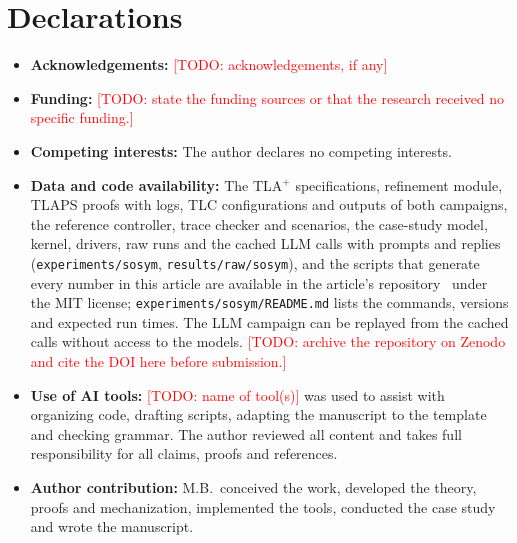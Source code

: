 \documentclass[pdflatex,sn-mathphys-num]{sn-jnl}
\theoremstyle{thmstyleone}%
\theoremstyle{thmstyletwo}%
\theoremstyle{thmstylethree}%
\newcommand{\todo}[1]{\textcolor{red}{[TODO: #1]}}
\newcommand{\tla}{TLA$^+$}
\begin{document}
\section*{Declarations}
\begin{itemize}
\item \textbf{Acknowledgements:} \todo{acknowledgements, if any}
\item \textbf{Funding:} \todo{state the funding sources or that the research received no specific funding.}
\item \textbf{Competing interests:} The author declares no competing interests.
\item \textbf{Data and code availability:} The \tla{} specifications, refinement module, TLAPS proofs with logs, TLC configurations and outputs of both campaigns, the reference controller, trace checker and scenarios, the case-study model, kernel, drivers, raw runs and the cached LLM calls with prompts and replies (\texttt{experiments/sosym}, \texttt{results/raw/sosym}), and the scripts that generate every number in this article are available in the article's repository~\cite{repo_safe_coordination_untrusted_agents} under the MIT license; \texttt{experiments/sosym/README.md} lists the commands, versions and expected run times. The LLM campaign can be replayed from the cached calls without access to the models. \todo{archive the repository on Zenodo and cite the DOI here before submission.}
\item \textbf{Use of AI tools:} \todo{name of tool(s)} was used to assist with organizing code, drafting scripts, adapting the manuscript to the template and checking grammar. The author reviewed all content and takes full responsibility for all claims, proofs and references.
\item \textbf{Author contribution:} M.B.\ conceived the work, developed the theory, proofs and mechanization, implemented the tools, conducted the case study and wrote the manuscript.
\end{itemize}
\end{document}
